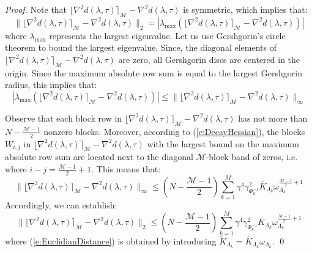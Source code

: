 \begin{proof}
Note that $\lfloor \nabla^2 d(\lambda, \tau) \rceil_{\mathcal{M}} - \nabla^2 d(\lambda, \tau)$ is symmetric, which implies that:
\begin{equation}
\| \lfloor \nabla^2 d(\lambda, \tau) \rceil_{\mathcal{M}} - \nabla^2 d(\lambda, \tau) \|_2 = | \lambda_{\max} ( \lfloor \nabla^2 d(\lambda, \tau) \rceil_{\mathcal{M}} - \nabla^2 d(\lambda, \tau) ) |
\end{equation}
where $\lambda_{\max}$ represents the largest eigenvalue. Let us use Gershgorin's circle theorem to bound the largest eigenvalue. Since, the diagonal elements of $\lfloor \nabla^2 d(\lambda, \tau) \rceil_{\mathcal{M}} - \nabla^2 d(\lambda, \tau)$ are zero, all Gershgorin discs are centered in the origin. Since the maximum absolute row sum is equal to the largest Gershgorin radius, this implies that:
\begin{equation}
| \lambda_{\max} ( \lfloor \nabla^2 d(\lambda, \tau) \rceil_{\mathcal{M}} - \nabla^2 d(\lambda, \tau) ) | \leq \| \lfloor \nabla^2 d(\lambda, \tau) \rceil_{\mathcal{M}} - \nabla^2 d(\lambda, \tau) \|_{\infty}
\end{equation}

Observe that each block row in $ \lfloor \nabla^2 d(\lambda, \tau) \rceil_{\mathcal{M}} - \nabla^2 d(\lambda, \tau)$ has not more than $N -\frac{\mathcal{M} - 1}{2}$ nonzero blocks. Moreover, according to (\ref{e:DecayHessian}), the blocks $W_{i,j}$ in $\lfloor \nabla^2 d(\lambda, \tau) \rceil_{\mathcal{M}} - \nabla^2 d(\lambda, \tau)$ with the largest bound on the maximum absolute row sum are located next to the diagonal $\mathcal{M}$-block band of zeros, i.e. where $i - j = \frac{\mathcal{M} - 1}{2} + 1$. This means that:
\begin{equation} \label{e:BoundGershgorinRadius}
\| \lfloor \nabla^2 d(\lambda, \tau) \rceil_{\mathcal{M}} - \nabla^2 d(\lambda, \tau) \|_{\infty} \leq \left( N -\frac{\mathcal{M} - 1}{2} \right) \sum_{k=1}^M \gamma^4 \gamma_{\Phi_k^{-1}}^2 \bar{K}_{\Lambda_k} \omega_{\Lambda_k}^{\frac{\mathcal{M} - 1}{2} + 1}
\end{equation}
Accordingly, we can establish:
\begin{equation} 
\| \lfloor \nabla^2 d(\lambda, \tau) \rceil_{\mathcal{M}} - \nabla^2 d(\lambda, \tau) \|_2 \leq \left( N -\frac{\mathcal{M} - 1}{2} \right) \sum_{k=1}^M \gamma^4 \gamma_{\Phi_k^{-1}}^2 \bar{K}_{\Lambda_k} \omega_{\Lambda_k}^{\frac{\mathcal{M} - 1}{2} + 1}
\end{equation}
where (\ref{e:EuclidianDistance}) is obtained by introducing $\tilde{K}_{\Lambda_k} = \bar{K}_{\Lambda_k} \omega_{\Lambda_k}$.
\qed
\end{proof}


